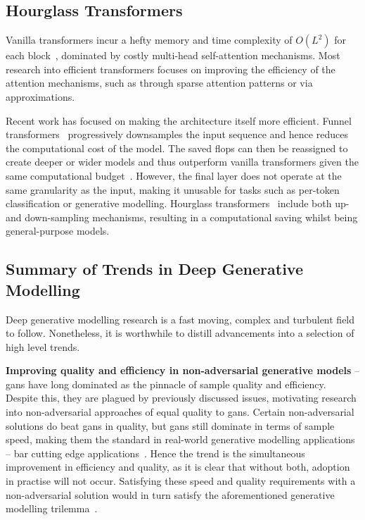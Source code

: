 \subsection{Hourglass Transformers}
\label{subsec:hourglass}

Vanilla transformers incur a hefty memory and time complexity of $O(L^2)$ for
each block~\cite{vaswani2017attention}, dominated by costly multi-head
self-attention mechanisms. Most research into efficient transformers focuses on
improving the efficiency of the attention mechanisms, such as through sparse
attention patterns or via approximations.

Recent work has focused on making the architecture itself more efficient. Funnel
transformers~\cite{dai2020funneltransformer} progressively downsamples the input
sequence and hence reduces the computational cost of the model. The saved
\glspl{flop} can then be reassigned to create deeper or wider models and thus
outperform vanilla transformers given the same computational
budget~\cite{dai2020funneltransformer}. However, the final layer does not
operate at the same granularity as the input, making it unusable for tasks such
as per-token classification or generative modelling. Hourglass
transformers~\cite{nawrot2021hierarchical} include both up- and down-sampling
mechanisms, resulting in a computational saving whilst being general-purpose
models.

\subsection{Summary of Trends in Deep Generative Modelling}
\label{subsec:trends}

Deep generative modelling research is a fast moving, complex and turbulent field
to follow. Nonetheless, it is worthwhile to distill advancements into a
selection of high level trends.

\textbf{Improving quality and efficiency in non-adversarial generative models} -- 
\glspl{gan} have long dominated as the pinnacle of sample quality and
efficiency. Despite this, they are plagued by previously discussed issues,
motivating research into non-adversarial approaches of equal quality to
\glspl{gan}. Certain non-adversarial solutions do beat \glspl{gan} in quality,
but \glspl{gan} still dominate in terms of sample speed, making them the
standard in real-world generative modelling applications -- bar cutting
edge applications~\cite{ramesh2021dalle,ramesh2022dalle2}. Hence the trend is
the simultaneous improvement in efficiency and quality, as it is clear that
without both, adoption in practise will not occur. Satisfying these speed and
quality requirements with a non-adversarial solution would in turn satisfy the
aforementioned generative modelling trilemma~\cite{xiao2021trilemma}.

